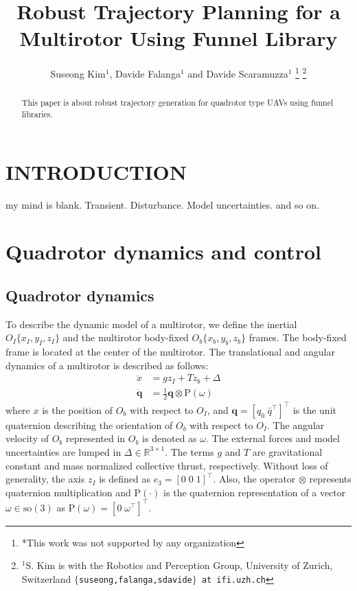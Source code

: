 \documentclass[letterpaper, 10 pt, conference]{ieeeconf}  %
\title{\LARGE \bf
Robust Trajectory Planning for a Multirotor Using Funnel Library
}
\author{Suseong Kim$^{1}$, Davide Falanga$^{1}$ and Davide Scaramuzza$^{1}$%
\thanks{*This work was not supported by any organization}%
\thanks{$^{1}$S. Kim is with the Robotics and Perception Group, University of Zurich, Switzerland
        {\tt\small $\{$suseong,falanga,sdavide$\}$ at ifi.uzh.ch}}%
}
\begin{document}
\maketitle
\thispagestyle{empty}
\pagestyle{empty}


\begin{abstract}

This paper is about robust trajectory generation for quadrotor type UAVs using funnel libraries.

\end{abstract}


\section{INTRODUCTION}

my mind is blank.
Transient. Disturbance. Model uncertainties. and so on.

\section{Quadrotor dynamics and control}

\subsection{Quadrotor dynamics}
To describe the dynamic model of a multirotor, we define the inertial $O_I\{x_I,y_I,z_I\}$ and the multirotor body-fixed $O_b\{x_b,y_b,z_b\}$ frames. The body-fixed frame is located at the center of the multirotor. 
The translational and angular dynamics of a multirotor is described as follows:
\begin{align}
\ddot{x} &= gz_I + Tz_b + \Delta \label{eq:translational} \\
\dot{\textbf{q}} &= \textstyle{\frac{1}{2}}\textbf{q}\otimes \text{P}(\omega) \label{eq:rotational}
\end{align}
where $x$ is the position of $O_b$ with respect to $O_I$, and $\textbf{q} = [q_0\;\bar{q}^\intercal]^\intercal$ is the unit quaternion describing the orientation of $O_b$ with respect to $O_I$.
The angular velocity of $O_b$ represented in $O_b$ is denoted as $\omega$.
The external forces and model uncertainties are lumped in $\Delta \in \mathbb{R}^{3\times 1}$. 
The terms $g$ and $T$ are gravitational constant and mass normalized collective thrust, respectively. 
Without loss of generality, the axis $z_I$ is defined as $e_3 = [0\;0\;1]^\intercal$.
Also, the operator $\otimes$ represents quaternion multiplication and $\text{P}(\cdot)$ is the quaternion representation of a vector ${\omega} \in \text{so}(3)$ as $\text{P}({\omega}) = [0\;{\omega}^\intercal]^\intercal$. 
\end{document}
